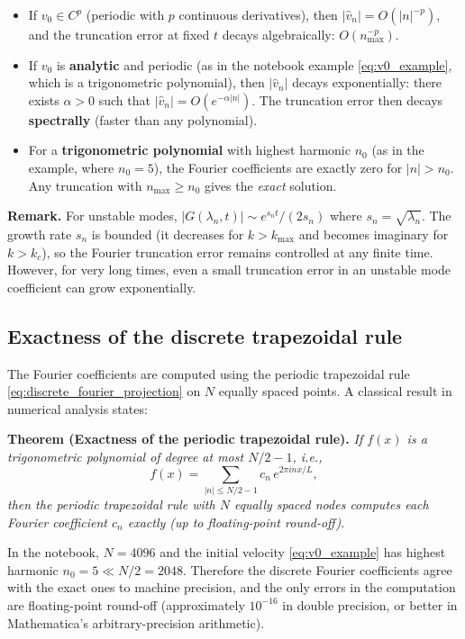 \documentclass[11pt,a4paper]{article}
\begin{document}
\begin{itemize}[leftmargin=*]
    \item If $v_0\in C^p$ (periodic with $p$ continuous derivatives), then $|\widehat{v}_n|=O(|n|^{-p})$, and the truncation error at fixed $t$ decays algebraically: $O(n_{\max}^{-p})$.
    \item If $v_0$ is \textbf{analytic} and periodic (as in the notebook example \eqref{eq:v0_example}, which is a trigonometric polynomial), then $|\widehat{v}_n|$ decays exponentially: there exists $\alpha>0$ such that $|\widehat{v}_n|=O(e^{-\alpha|n|})$.  The truncation error then decays \textbf{spectrally} (faster than any polynomial).
    \item For a \textbf{trigonometric polynomial} with highest harmonic $n_0$ (as in the example, where $n_0=5$), the Fourier coefficients are exactly zero for $|n|>n_0$.  Any truncation with $n_{\max}\ge n_0$ gives the \emph{exact} solution.
\end{itemize}

\textbf{Remark.}  For unstable modes, $|G(\lambda_n,t)|\sim e^{s_n t}/(2s_n)$ where $s_n=\sqrt{\lambda_n}$.  The growth rate $s_n$ is bounded (it decreases for $k>k_{\max}$ and becomes imaginary for $k>k_c$), so the Fourier truncation error remains controlled at any finite time.  However, for very long times, even a small truncation error in an unstable mode coefficient can grow exponentially.

\subsection{Exactness of the discrete trapezoidal rule}

The Fourier coefficients are computed using the periodic trapezoidal rule \eqref{eq:discrete_fourier_projection} on $N$ equally spaced points.  A classical result in numerical analysis states:

\medskip
\noindent\textbf{Theorem (Exactness of the periodic trapezoidal rule).}  \textit{If $f(x)$ is a trigonometric polynomial of degree at most $N/2-1$, i.e.,}
\begin{equation}
    f(x) = \sum_{|n|\le N/2-1} c_n\,e^{2\pi i n x/L},
\end{equation}
\textit{then the periodic trapezoidal rule with $N$ equally spaced nodes computes each Fourier coefficient $c_n$ exactly (up to floating-point round-off).}

\medskip
In the notebook, $N=4096$ and the initial velocity \eqref{eq:v0_example} has highest harmonic $n_0=5\ll N/2=2048$.  Therefore the discrete Fourier coefficients agree with the exact ones to machine precision, and the only errors in the computation are floating-point round-off (approximately $10^{-16}$ in double precision, or better in Mathematica's arbitrary-precision arithmetic).
\end{document}
